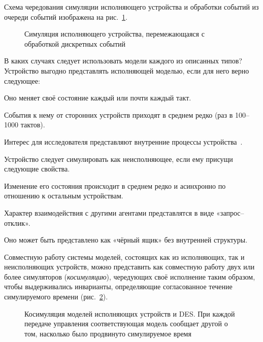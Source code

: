 Схема чередования симуляции исполняющего устройства и обработки событий из очереди событий изображена на рис.~\ref{fig:queue2}.

\begin{figure}[htb]
    \centering
    \caption{Симуляция исполняющего устройства, перемежающаяся с обработкой дискретных событий}
    \label{fig:queue2}
\end{figure}

В каких случаях следует использовать модели каждого из описанных типов? Устройство выгодно представлять исполняющей моделью, если для него верно следующее:
\begin{enumerate*}
    \item Оно меняет своё состояние каждый или почти каждый такт.
    \item События к нему от сторонних устройств приходят в среднем редко (раз в 100--1000 тактов).
    \item Интерес для исследователя представляют внутренние процессы устройства~\cite{fritzson2004principles}.
\end{enumerate*}

Устройство следует симулировать как неисполняющее, если ему присущи следующие свойства.
\begin{enumerate*}
    \item Изменение его состояния происходит в среднем редко и асинхронно по отношению к остальным устройствам.
    \item Характер взаимодействия с другими агентами представлятся в виде «запрос--отклик».
    \item Оно может быть представлено как «чёрный ящик» без внутренней структуры.
\end{enumerate*}

Совместную работу системы моделей, состоящих как из исполняющих, так и неисполняющих устройств, можно представить как совместную работу двух или более симуляторов (\textit{косимуляцию}), чередующих своё исполнение таким образом, чтобы выдерживались инварианты, определяющие согласованное течение симулируемого времени (рис.~\ref{fig:cosim}).

\begin{figure}[htb]
    \centering
    \caption[Косимуляция моделей исполняющих устройств и DES]{Косимуляция моделей исполняющих устройств и DES. При каждой передаче управления соответствующая модель сообщает другой о том, насколько было продвинуто симулируемое время}
    \label{fig:cosim}
\end{figure}

